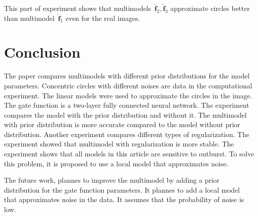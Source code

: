 \documentclass[12pt, twoside]{article}
\numberwithin{equation}{section}
\begin{document}
This part of experiment shows that multimodels~$\hat{\mathbf{f}}_2, \hat{\mathbf{f}}_3$ approximate circles better than multimodel~$\hat{\mathbf{f}}_1$ even for the real images.


\section{Conclusion}
The paper compares multimodels with different prior distributions for the model parameters. Concentric circles with different noises are data in the computational experiment. The linear models were used to approximate the circles in the image. The gate function is a two-layer fully connected neural network.
The experiment compares the model with the prior distribution and without it. The multimodel with prior distribution is more accurate compared to the model without prior distribution.
Another experiment compares different types of regularization. The experiment showed that multimodel with regularization is more stable.
The experiment shows that all models in this article are sensitive to outburst. To solve this problem, it is proposed to use a local model that approximates noise.

The future work, plannes to improve the multimodel by adding a prior distribution for the gate function parameters. It plannes to add a local model that approximates noise in the data. It assumes that the probability of noise is low.
\end{document}
